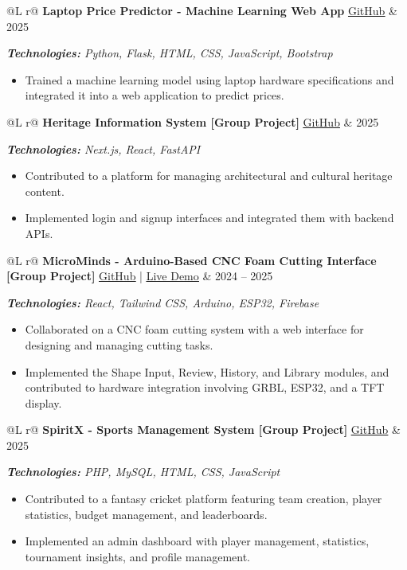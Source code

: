 \documentclass[10pt,a4paper]{article}
\makeatletter
\newcommand{\repolink}[1]{%
    \href{#1}{\underline{GitHub}}
}
\newenvironment{cvproject}[4]{%
    \par\noindent
    \begin{tabularx}{\linewidth}{@{}L r@{}}
        \textbf{#1}\quad #2 & #4 \\
    \end{tabularx}\par

    \textit{\textbf{Technologies:} #3}\par
    \nopagebreak

    \begin{itemize}[
        leftmargin=13pt,
        itemsep=0.4pt,
        topsep=0.5pt,
        parsep=0pt,
        partopsep=0pt
    ]
}{%
    \end{itemize}
    \par\vspace{5pt}
}
\makeatother
\begin{document}
\begin{cvproject}
    {Laptop Price Predictor - Machine Learning Web App}
    {\repolink{https://github.com/savandikodithuwakku/Laptop-price-predictor}}
    {Python, Flask, HTML, CSS, JavaScript, Bootstrap}
    {2025}

    \item Trained a machine learning model using laptop hardware
    specifications and integrated it into a web application to predict prices.

\end{cvproject}

\begin{cvproject}
    {Heritage Information System [Group Project]}
    {\repolink{https://github.com/orgs/FOA-Project/repositories}}
    {Next.js, React, FastAPI}
    {2025}

    \item Contributed to a platform for managing architectural and cultural
    heritage content.

    \item Implemented login and signup interfaces and integrated them with
    backend APIs.

\end{cvproject}

\begin{cvproject}
    {MicroMinds - Arduino-Based CNC Foam Cutting Interface [Group Project]}
    {\repolink{https://github.com/Micro-Minds/foam-cutter-frontend} | \href{https://cnc-foam-cutter.web.app/signin}{\underline{Live Demo}}}
    {React, Tailwind CSS, Arduino, ESP32, Firebase}
    {2024 -- 2025}

    \item Collaborated on a CNC foam cutting system with a web interface
    for designing and managing cutting tasks.

    \item Implemented the Shape Input, Review, History, and Library modules,
    and contributed to hardware integration involving GRBL, ESP32, and a
    TFT display.

\end{cvproject}

\begin{cvproject}
    {SpiritX - Sports Management System [Group Project]}
    {\repolink{https://github.com/ByteShiftTeam/Admin}}
    {PHP, MySQL, HTML, CSS, JavaScript}
    {2025}

    \item Contributed to a fantasy cricket platform featuring team creation,
    player statistics, budget management, and leaderboards.

    \item Implemented an admin dashboard with player management, statistics,
    tournament insights, and profile management.

\end{cvproject}
\end{document}
